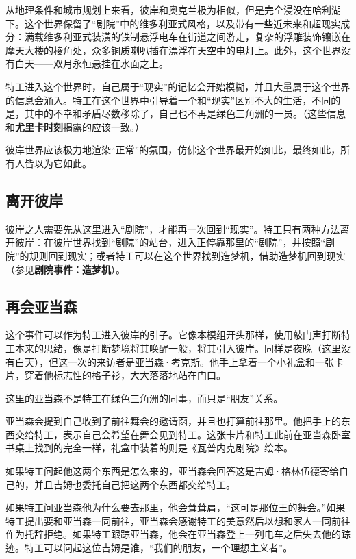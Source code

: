 从地理条件和城市规划上来看，彼岸和奥克兰极为相似，但是完全浸没在哈利湖下。这个世界保留了“剧院”中的维多利亚式风格，以及带有一些近未来和超现实成分：满载维多利亚式装潢的铁制悬浮电车在街道之间游走，复杂的浮雕装饰镶嵌在摩天大楼的棱角处，众多铜质喇叭插在漂浮在天空中的电灯上。此外，这个世界没有白天——双月永恒悬挂在水面之上。

特工进入这个世界时，自己属于“现实”的记忆会开始模糊，并且大量属于这个世界的信息会涌入。特工在这个世界中引导着一个和“现实”区别不大的生活，不同的是，其中的不幸和矛盾尽数移除了，自己也不再是绿色三角洲的一员。（这些信息和\textbf{尤里卡时刻}揭露的应该一致。）

彼岸世界应该极力地渲染“正常”的氛围，仿佛这个世界最开始如此，最终如此，所有人皆以为它如此。

\subsection{离开彼岸}

彼岸之人需要先从这里进入“剧院”，才能再一次回到“现实”。特工只有两种方法离开彼岸：在彼岸世界找到“剧院”的站台，进入正停靠那里的“剧院”，并按照“剧院”的规则回到现实；或者特工可以在这个世界找到造梦机，借助造梦机回到现实（参见\textbf{剧院事件：造梦机}）。

\subsection{再会亚当森}

这个事件可以作为特工进入彼岸的引子。它像本模组开头那样，使用敲门声打断特工本来的思绪，像是打断梦境将其唤醒一般，将其引入彼岸。同样是夜晚（这里没有白天），但这一次的来访者是亚当森·考克斯。他手上拿着一个小礼盒和一张卡片，穿着他标志性的格子衫，大大落落地站在门口。

这里的亚当森不是特工在绿色三角洲的同事，而只是“朋友”关系。

亚当森会提到自己收到了前往舞会的邀请函，并且也打算前往那里。他把手上的东西交给特工，表示自己会希望在舞会见到特工。这张卡片和特工此前在亚当森卧室书桌上找到的完全一样，礼盒中装着的则是《瓦普内克剧院》绘本。

如果特工问起他这两个东西是怎么来的，亚当森会回答这是吉姆·格林伍德寄给自己的，并且吉姆也委托自己把这两个东西都交给特工。

如果特工问亚当森他为什么要去那里，他会耸耸肩，“这可是那位王的舞会。”如果特工提出要和亚当森一同前往，亚当森会感谢特工的美意然后以想和家人一同前往作为托辞拒绝。如果特工跟踪亚当森，他会在亚当森登上一列电车之后失去他的踪迹。特工可以问起这位吉姆是谁，“我们的朋友，一个理想主义者”。

